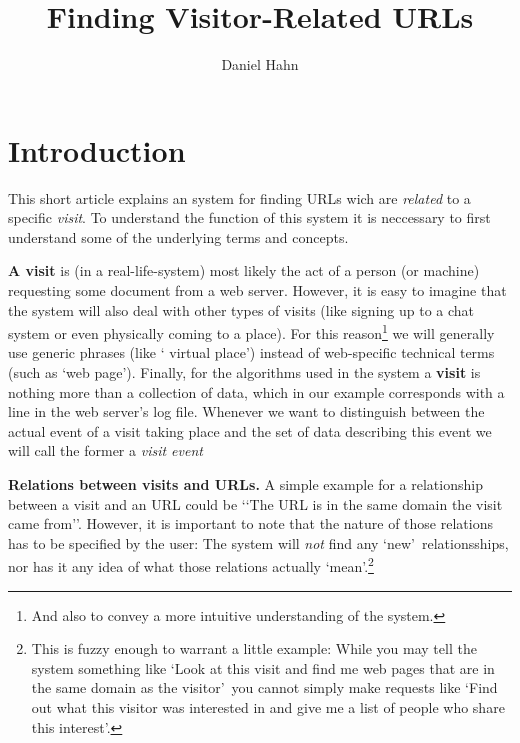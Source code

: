 \documentclass[a4paper]{danarticle}
\begin{document}
  \author{Daniel Hahn}
  \title{Finding Visitor-Related URLs}
  \maketitle
  
  \section*{Introduction}
    This short article explains an system for finding URLs wich are
    \textit{related} to a specific \textit{visit}. To understand the
    function of this system it is neccessary to first understand
    some of the underlying terms and concepts.
    
    \textbf{A visit} is (in a real-life-system) most likely the
    act of a person (or machine) requesting some document from a
    web server. However, it is easy to imagine that the system will
    also deal with other types of visits (like signing up to a
    chat system or even physically coming to a place). For this
    reason\footnote{And also to convey a more intuitive understanding
    of the system.} we will generally use generic phrases (like \lq 
    virtual place\rq ) instead of web-specific technical terms (such
    as \lq web page\rq ). Finally, for the algorithms used in the
    system a \textbf{visit} is nothing more than a collection of
    data, which in our example corresponds with a line in the web
    server's log file. Whenever we want to distinguish between the
    actual event of a visit taking place and the set of data
    describing this event we will call the former a \textit{visit event}
   
    \textbf{Relations between visits and URLs.} A simple example
    for a relationship between a visit and an URL could be
    \lq\lq The URL is in the same domain the visit came from\rq\rq .
    However, it is important to note that the nature of those 
    relations has to be specified by the user: The system will 
    \textit{not} find any \lq new\rq\ relationsships, nor has it 
    any idea of what those relations actually \lq mean\rq .\footnote{This
    is fuzzy enough to warrant a little example: While you may tell the
    system something like \lq Look at this visit and find me web 
    pages that are in the same domain as the visitor\rq\ you cannot
    simply make requests like \lq Find out what this visitor was 
    interested in and give me a list of people who share this
    interest\rq .} 
\end{document}
